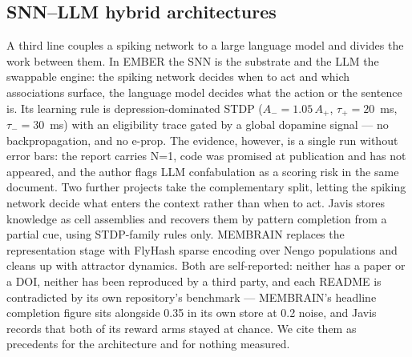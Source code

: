 \documentclass[11pt]{article}
\begin{document}
\subsection{SNN--LLM hybrid architectures}
A third line couples a spiking network to a large language model and divides the
work between them. In EMBER \citep{savage2026ember} the SNN is the substrate and
the LLM the swappable engine: the spiking network decides when to act and which
associations surface, the language model decides what the action or the sentence
is. Its learning rule is depression-dominated STDP ($A_- = 1.05\,A_+$,
$\tau_+ = 20$~ms, $\tau_- = 30$~ms) with an eligibility trace gated by a global
dopamine signal --- no backpropagation, and no e-prop. The evidence, however, is a
single run without error bars: the report carries N=1, code was promised at
publication and has not appeared, and the author flags LLM confabulation as a
scoring risk in the same document. Two further projects take the complementary
split, letting the spiking network decide what enters the context rather than when
to act. Javis \citep{javis2026} stores knowledge as cell assemblies and recovers
them by pattern completion from a partial cue, using STDP-family rules only.
MEMBRAIN \citep{membrain2026} replaces the representation stage with FlyHash
sparse encoding over Nengo populations and cleans up with attractor dynamics.
Both are self-reported: neither has a paper or a DOI, neither has been reproduced
by a third party, and each README is contradicted by its own repository's
benchmark --- MEMBRAIN's headline completion figure sits alongside 0.35 in its own
store at 0.2 noise, and Javis records that both of its reward arms stayed at
chance. We cite them as precedents for the architecture and for nothing measured.
\end{document}
